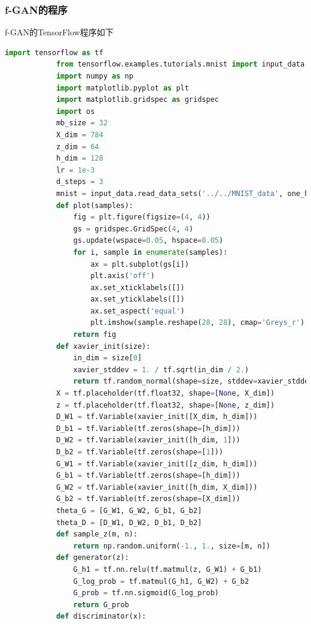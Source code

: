         \subsubsection{f-GAN的程序}
            \par
            f-GAN的TensorFlow程序如下
            \begin{lstlisting}[language = Python]
            import tensorflow as tf
            from tensorflow.examples.tutorials.mnist import input_data
            import numpy as np
            import matplotlib.pyplot as plt
            import matplotlib.gridspec as gridspec
            import os
            mb_size = 32
            X_dim = 784
            z_dim = 64
            h_dim = 128
            lr = 1e-3
            d_steps = 3
            mnist = input_data.read_data_sets('../../MNIST_data', one_hot=True)
            def plot(samples):
                fig = plt.figure(figsize=(4, 4))
                gs = gridspec.GridSpec(4, 4)
                gs.update(wspace=0.05, hspace=0.05)
                for i, sample in enumerate(samples):
                    ax = plt.subplot(gs[i])
                    plt.axis('off')
                    ax.set_xticklabels([])
                    ax.set_yticklabels([])
                    ax.set_aspect('equal')
                    plt.imshow(sample.reshape(28, 28), cmap='Greys_r')
                return fig
            def xavier_init(size):
                in_dim = size[0]
                xavier_stddev = 1. / tf.sqrt(in_dim / 2.)
                return tf.random_normal(shape=size, stddev=xavier_stddev)
            X = tf.placeholder(tf.float32, shape=[None, X_dim])
            z = tf.placeholder(tf.float32, shape=[None, z_dim])
            D_W1 = tf.Variable(xavier_init([X_dim, h_dim]))
            D_b1 = tf.Variable(tf.zeros(shape=[h_dim]))
            D_W2 = tf.Variable(xavier_init([h_dim, 1]))
            D_b2 = tf.Variable(tf.zeros(shape=[1]))
            G_W1 = tf.Variable(xavier_init([z_dim, h_dim]))
            G_b1 = tf.Variable(tf.zeros(shape=[h_dim]))
            G_W2 = tf.Variable(xavier_init([h_dim, X_dim]))
            G_b2 = tf.Variable(tf.zeros(shape=[X_dim]))
            theta_G = [G_W1, G_W2, G_b1, G_b2]
            theta_D = [D_W1, D_W2, D_b1, D_b2]
            def sample_z(m, n):
                return np.random.uniform(-1., 1., size=[m, n])
            def generator(z):
                G_h1 = tf.nn.relu(tf.matmul(z, G_W1) + G_b1)
                G_log_prob = tf.matmul(G_h1, G_W2) + G_b2
                G_prob = tf.nn.sigmoid(G_log_prob)
                return G_prob
            def discriminator(x):

\end{lstlisting}
